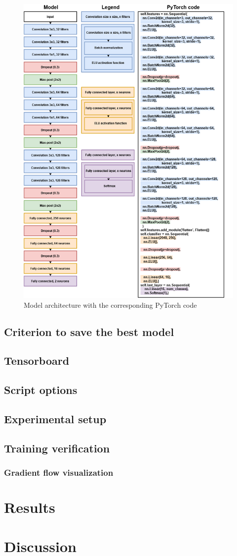\begin{figure}[!h]
\centering
\includegraphics[width=1\textwidth, keepaspectratio=true]{./figures/model_paper_manual.png}
\caption{Model architecture with the corresponding PyTorch code}
\label{fig:paper_model}
\end{figure}
\subsection{Criterion to save the best model}
\subsection{Tensorboard}
\label{paper_tensorboard}
\subsection{Script options}
\subsection{Experimental setup}
\subsection{Training verification}
\subsubsection{Gradient flow visualization}

\section{Results}

\section{Discussion}